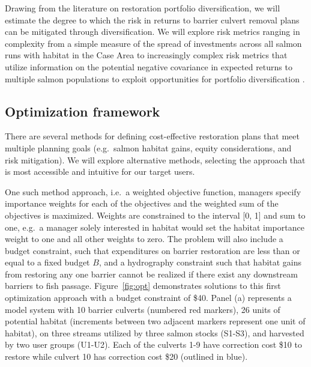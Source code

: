 \documentclass[12pt]{elsarticle}
\begin{document}
Drawing from the literature on restoration portfolio diversification, we will estimate the degree to which the risk in returns to barrier culvert removal plans can be mitigated through diversification. We will explore risk metrics ranging in complexity from a simple measure of the spread of investments across all salmon runs with habitat in the Case Area to increasingly complex risk metrics that utilize information on the potential negative covariance in expected returns to multiple salmon populations to exploit opportunities for portfolio diversification \citep{sanchirico_empirical_2008, jardine_fishermen_2015, johnston_combining_2002}.  

\subsection*{Optimization framework \label{sec:opt}}

There are several methods for defining cost-effective restoration plans that meet multiple planning goals (e.g.\ salmon habitat gains, equity considerations, and risk mitigation). We will explore alternative methods, selecting the approach that is most accessible and intuitive for our target users. 

One such method approach, i.e.\ a weighted objective function, managers specify importance weights for each of the objectives and the weighted sum of the objectives is maximized. Weights are constrained to the interval [0, 1] and sum to one, e.g.\ a manager solely interested in habitat would set the habitat importance weight to one and all other weights to zero. The problem will also include a budget constraint, such that expenditures on barrier restoration are less than or equal to a fixed budget $B$, and a hydrography constraint such that habitat gains from restoring any one barrier cannot be realized if there exist any downstream barriers to fish passage. Figure~\ref{fig:opt} demonstrates solutions to this first optimization approach with a budget constraint of \$40. Panel (a) represents a model system with 10 barrier culverts (numbered red markers), 26 units of potential habitat (increments between two adjacent markers represent one unit of habitat), on three streams utilized by three salmon stocks (S1-S3), and harvested by two user groups (U1-U2). Each of the culverts 1-9 have correction cost \$10 to restore while culvert 10 has correction cost \$20 (outlined in blue).
\end{document}
